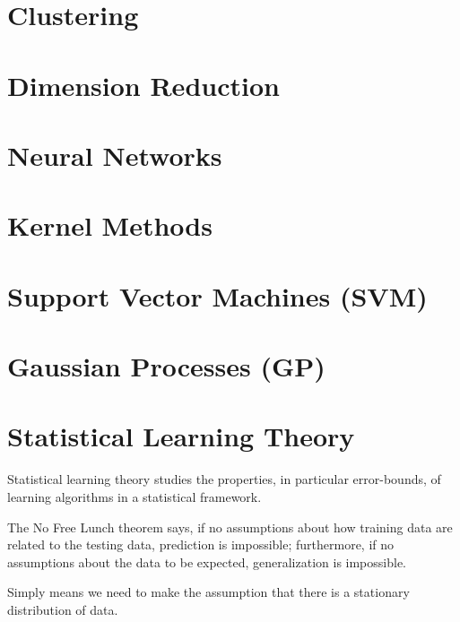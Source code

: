 \section{Clustering}
\section{Dimension Reduction}







\section{Neural Networks}
\section{Kernel Methods}
\section{Support Vector Machines (SVM)}
\section{Gaussian Processes (GP)}

\section{Statistical Learning Theory}
Statistical learning theory studies the properties, in particular error-bounds, of learning algorithms in a statistical framework.

The No Free Lunch theorem says, if no assumptions about how training data are related to the testing data, prediction is impossible; furthermore, if no assumptions about the data to be expected, generalization is impossible.

Simply means we need to make the assumption that there is a stationary distribution of data.



